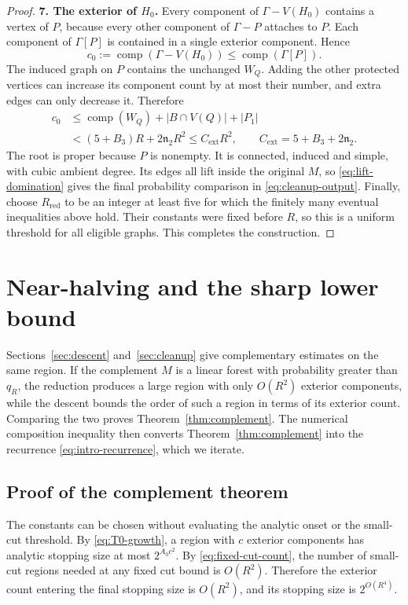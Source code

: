 \documentclass[11pt,a4paper]{article}
\numberwithin{equation}{section}
\theoremstyle{definition}
\theoremstyle{remark}
\newcommand{\cc}{\operatorname{comp}}
\newcommand{\proofstep}[1]{\par\addvspace{\medskipamount}\noindent\textbf{#1}\enspace\ignorespaces}
\begin{document}
\begin{proof}
\proofstep{7. The exterior of $H_0$.}
Every component of $\Gamma-V(H_0)$ contains a vertex of $P$, because every other component of $\Gamma-P$ attaches to $P$. Each component of $\Gamma[P]$ is contained in a single exterior component. Hence
\[
 c_0:=\cc(\Gamma-V(H_0))\le\cc(\Gamma[P]).
\]
The induced graph on $P$ contains the unchanged $W_Q$. Adding the other protected vertices can increase its component count by at most their number, and extra edges can only decrease it. Therefore
\begin{align*}
 c_0&\le\cc(W_Q)+|B\cap V(Q)|+|P_1|\\
    &<(5+B_3)R+2\mathfrak n_2R^2
     \le C_{\mathrm{ext}}R^2,
     \qquad C_{\mathrm{ext}}=5+B_3+2\mathfrak n_2.
\end{align*}
The root is proper because $P$ is nonempty. It is connected, induced and simple, with cubic ambient degree. Its edges all lift inside the original $M$, so \eqref{eq:lift-domination} gives the final probability comparison in \eqref{eq:cleanup-output}. Finally, choose $R_{\mathrm{red}}$ to be an integer at least five for which the finitely many eventual inequalities above hold. Their constants were fixed before $R$, so this is a uniform threshold for all eligible graphs. This completes the construction.
\end{proof}

\section{Near-halving and the sharp lower bound}\label{sec:contraction}
Sections~\ref{sec:descent} and~\ref{sec:cleanup} give complementary estimates on the same region. If the complement $M$ is a linear forest with probability greater than $q_R$, the reduction produces a large region with only $O(R^2)$ exterior components, while the descent bounds the order of such a region in terms of its exterior count. Comparing the two proves Theorem~\ref{thm:complement}. The numerical composition inequality then converts Theorem~\ref{thm:complement} into the recurrence \eqref{eq:intro-recurrence}, which we iterate.

\subsection{Proof of the complement theorem}\label{sec:complement-proof}
The constants can be chosen without evaluating the analytic onset or the small-cut threshold. By \eqref{eq:T0-growth}, a region with $c$ exterior components has analytic stopping size at most $2^{A_0c^2}$. By \eqref{eq:fixed-cut-count}, the number of small-cut regions needed at any fixed cut bound is $O(R^2)$. Therefore the exterior count entering the final stopping size is $O(R^2)$, and its stopping size is $2^{O(R^4)}$.
\end{document}
